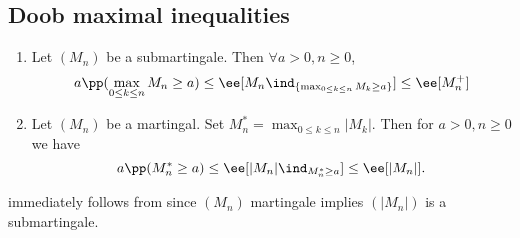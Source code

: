 \documentclass[../main.tex]{subfiles}
\begin{document}
  \subsection{Doob maximal inequalities}
  \begin{theorem}
    \hfill
    \begin{enumerate}
        \item Let $(M_n)$ be a submartingale. Then $\forall a > 0, n \geq 0$, 
          $$a \pp(\max_{0 \leq k \leq n} M_n \geq a) \leq \ee[M_n \ind_{\{
            \max_{0 \leq k \leq n} M_k \geq a \} }] \leq \ee[M_n^+]$$

        \item Let $(M_n)$ be a martingal. Set $M_n^* = \max_{0 \leq k \leq n}
          |M_k|$. Then for $a > 0, n \geq 0$ we have 
          \[
            a \pp(M_n^* \geq a) \leq \ee[|M_n| \ind_{M^*_n \geq a}] \leq \ee[|M_n|]
          .\] 
    \end{enumerate}
  \end{theorem}
  \begin{remark}
     immediately follows from  since $(M_n)$ martingale
    implies $(|M_n|)$ is a submartingale.
  \end{remark}
\end{document}

